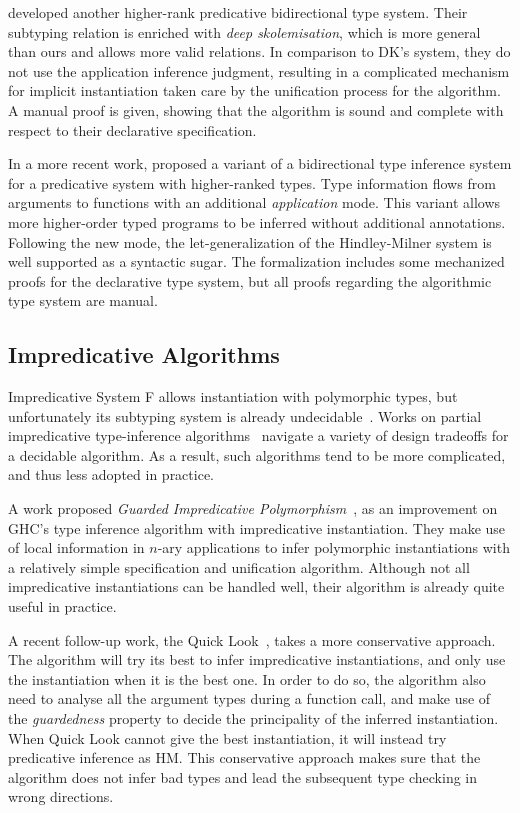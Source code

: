 \citet{jones2007practical} developed another higher-rank predicative bidirectional type system.
Their subtyping relation is enriched with \emph{deep skolemisation},
which is more general than ours and allows more valid relations.
In comparison to DK's system, they do not use the application inference judgment,
resulting in a complicated mechanism for implicit instantiation taken care by the unification process for the algorithm.
A manual proof is given, showing that the algorithm is sound and
complete with respect to their declarative specification.

In a more recent work, \citet{xie2018letarguments} proposed a variant of a
bidirectional type inference system for a predicative system with higher-ranked types.
Type information flows from arguments to
functions with an additional \emph{application} mode. This variant 
allows more higher-order typed programs to be inferred without additional annotations.
Following the new mode, the let-generalization of the Hindley-Milner system
is well supported as a syntactic sugar. The formalization includes some
mechanized proofs for the declarative type system, but all proofs regarding
the algorithmic type system are manual.

\subsection{Impredicative Algorithms}

Impredicative System F allows instantiation with polymorphic types,
but unfortunately its subtyping system is already undecidable~\citep{tiuryn1996subtyping}.
Works on partial impredicative type-inference algorithms~\citep{le2003ml,leijen2008hmf,vytiniotis2008fph}
navigate a variety of design tradeoffs for a decidable algorithm.
As a result, such algorithms tend to be more complicated, and thus less adopted in practice.

A work proposed \emph{Guarded Impredicative Polymorphism}~\citep{Serrano2018},
as an improvement on GHC's type inference algorithm with impredicative instantiation.
They make use of local information in $n$-ary applications to
infer polymorphic instantiations with a relatively simple specification and unification algorithm.
Although not all impredicative instantiations can be handled well,
their algorithm is already quite useful in practice.

A recent follow-up work, the Quick Look~\citep{quicklook2020},
takes a more conservative approach.
The algorithm will try its best to infer impredicative instantiations,
and only use the instantiation when it is the best one.
In order to do so,
the algorithm also need to analyse all the argument types during a function call,
and make use of the \emph{guardedness} property to decide the principality of
the inferred instantiation.
When Quick Look cannot give the best instantiation,
it will instead try predicative inference as HM.
This conservative approach makes sure that the algorithm does not infer bad types
and lead the subsequent type checking in wrong directions.

